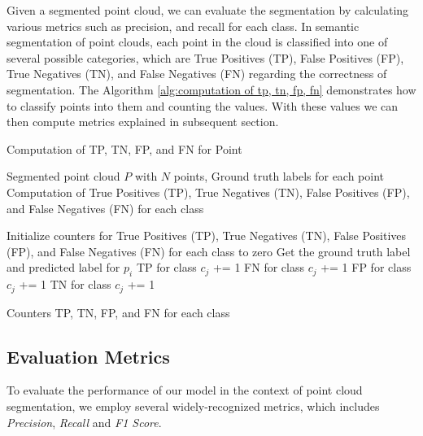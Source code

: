 \documentclass[11pt, a4paper,oneside,chapterprefix=false]{scrbook}
\begin{document}
Given a segmented point cloud, we can evaluate the segmentation by calculating various metrics such as precision, and recall for each class. In semantic segmentation of point clouds, each point in the cloud is classified into one of several possible categories, which are True Positives (TP), False Positives (FP), True Negatives (TN), and False Negatives (FN) regarding the correctness of segmentation. The Algorithm \ref{alg:computation of tp, tn, fp, fn} demonstrates how to classify points into them and counting the values. With these values we can then compute metrics explained in subsequent section.  

\begin{algorithm}[H]
\caption{Computation of TP, TN, FP, and FN for Point} \label{alg:computation of tp, tn, fp, fn}
\begin{algorithmic}[1]
\Require Segmented point cloud \(P\) with \(N\) points, Ground truth labels for each point
\Ensure Computation of True Positives (TP), True Negatives (TN), False Positives (FP), and False Negatives (FN) for each class

\State Initialize counters for True Positives (TP), True Negatives (TN), False Positives (FP), and False Negatives (FN) for each class to zero
    \State Get the ground truth label and predicted label for \(p_i\)
                \State TP for class \(c_j\) += 1
            \Else
                \State FN for class \(c_j\) += 1
            \EndIf
        \Else
                \State FP for class \(c_j\) += 1
            \Else
                \State TN for class \(c_j\) += 1
            \EndIf
        \EndIf
    \EndFor
\EndFor

\State \Return Counters TP, TN, FP, and FN for each class
\end{algorithmic}
\end{algorithm}

\subsection{Evaluation Metrics} \label{par:evaluation metrics}

To evaluate the performance of our model in the context of point cloud segmentation, we employ several widely-recognized metrics, which includes \emph{Precision}, \emph{Recall} and \emph{F1 Score}. 
\end{document}

